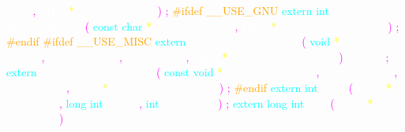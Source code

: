 \textcolor{white}{\_\_n} 
\textcolor{magenta}{,} 
\textcolor{white}{FILE} 
\textcolor{yellow}{*} 
\textcolor{white}{\_\_restrict} 
\textcolor{white}{\_\_s} 
\textcolor{magenta}{)} 
\textcolor{magenta}{;} 
\textcolor{orange}{\#ifdef \_\_USE\_GNU} 
\textcolor{cyan}{extern} 
\textcolor{cyan}{int} 
\textcolor{white}{fputs\_unlocked} 
\textcolor{magenta}{(} 
\textcolor{cyan}{const} 
\textcolor{cyan}{char} 
\textcolor{yellow}{*} 
\textcolor{white}{\_\_restrict} 
\textcolor{white}{\_\_s} 
\textcolor{magenta}{,} 
\textcolor{white}{FILE} 
\textcolor{yellow}{*} 
\textcolor{white}{\_\_restrict} 
\textcolor{white}{\_\_stream} 
\textcolor{magenta}{)} 
\textcolor{magenta}{;} 
\textcolor{orange}{\#endif} 
\textcolor{orange}{\#ifdef \_\_USE\_MISC} 
\textcolor{cyan}{extern} 
\textcolor{white}{size\_t} 
\textcolor{white}{fread\_unlocked} 
\textcolor{magenta}{(} 
\textcolor{cyan}{void} 
\textcolor{yellow}{*} 
\textcolor{white}{\_\_restrict} 
\textcolor{white}{\_\_ptr} 
\textcolor{magenta}{,} 
\textcolor{white}{size\_t} 
\textcolor{white}{\_\_size} 
\textcolor{magenta}{,} 
\textcolor{white}{size\_t} 
\textcolor{white}{\_\_n} 
\textcolor{magenta}{,} 
\textcolor{white}{FILE} 
\textcolor{yellow}{*} 
\textcolor{white}{\_\_restrict} 
\textcolor{white}{\_\_stream} 
\textcolor{magenta}{)} 
\textcolor{white}{\_\_wur} 
\textcolor{magenta}{;} 
\textcolor{cyan}{extern} 
\textcolor{white}{size\_t} 
\textcolor{white}{fwrite\_unlocked} 
\textcolor{magenta}{(} 
\textcolor{cyan}{const} 
\textcolor{cyan}{void} 
\textcolor{yellow}{*} 
\textcolor{white}{\_\_restrict} 
\textcolor{white}{\_\_ptr} 
\textcolor{magenta}{,} 
\textcolor{white}{size\_t} 
\textcolor{white}{\_\_size} 
\textcolor{magenta}{,} 
\textcolor{white}{size\_t} 
\textcolor{white}{\_\_n} 
\textcolor{magenta}{,} 
\textcolor{white}{FILE} 
\textcolor{yellow}{*} 
\textcolor{white}{\_\_restrict} 
\textcolor{white}{\_\_stream} 
\textcolor{magenta}{)} 
\textcolor{magenta}{;} 
\textcolor{orange}{\#endif} 
\textcolor{cyan}{extern} 
\textcolor{cyan}{int} 
\textcolor{white}{fseek} 
\textcolor{magenta}{(} 
\textcolor{white}{FILE} 
\textcolor{yellow}{*} 
\textcolor{white}{\_\_stream} 
\textcolor{magenta}{,} 
\textcolor{cyan}{long} 
\textcolor{cyan}{int} 
\textcolor{white}{\_\_off} 
\textcolor{magenta}{,} 
\textcolor{cyan}{int} 
\textcolor{white}{\_\_whence} 
\textcolor{magenta}{)} 
\textcolor{magenta}{;} 
\textcolor{cyan}{extern} 
\textcolor{cyan}{long} 
\textcolor{cyan}{int} 
\textcolor{white}{ftell} 
\textcolor{magenta}{(} 
\textcolor{white}{FILE} 
\textcolor{yellow}{*} 
\textcolor{white}{\_\_stream} 
\textcolor{magenta}{)} 
\textcolor{white}{\_\_wur} 
